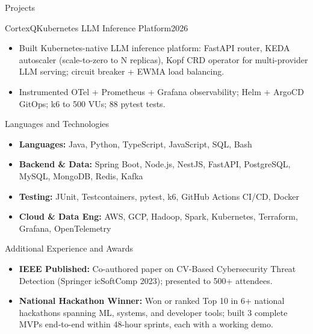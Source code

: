 \documentclass[]{mcdowellcv}
\begin{document}
\begin{cvsection}{Projects}
  \begin{cvsubsection}{CortexQ}{Kubernetes LLM Inference Platform}{2026}
    \begin{itemize}
      \item Built Kubernetes-native LLM inference platform: FastAPI router, KEDA autoscaler (scale-to-zero to N replicas), Kopf CRD operator for multi-provider LLM serving; circuit breaker + EWMA load balancing.
      \item Instrumented OTel + Prometheus + Grafana observability; Helm + ArgoCD GitOps; k6 to 500 VUs; 88 pytest tests.
    \end{itemize}
  \end{cvsubsection}
\end{cvsection}

\begin{cvsection}{Languages and Technologies}
  \begin{cvsubsection}{}{}{}
    \begin{itemize}
      \item \textbf{Languages:} Java, Python, TypeScript, JavaScript, SQL, Bash
      \item \textbf{Backend \& Data:} Spring Boot, Node.js, NestJS, FastAPI, PostgreSQL, MySQL, MongoDB, Redis, Kafka
      \item \textbf{Testing:} JUnit, Testcontainers, pytest, k6, GitHub Actions CI/CD, Docker
      \item \textbf{Cloud \& Data Eng:} AWS, GCP, Hadoop, Spark, Kubernetes, Terraform, Grafana, OpenTelemetry
    \end{itemize}
  \end{cvsubsection}
\end{cvsection}

\begin{cvsection}{Additional Experience and Awards}
  \begin{cvsubsection}{}{}{}
    \begin{itemize}
      \item \textbf{IEEE Published:} Co-authored paper on CV-Based Cybersecurity Threat Detection (Springer icSoftComp 2023); presented to 500+ attendees.
      \item \textbf{National Hackathon Winner:} Won or ranked Top 10 in 6+ national hackathons spanning ML, systems, and developer tools; built 3 complete MVPs end-to-end within 48-hour sprints, each with a working demo.
    \end{itemize}
  \end{cvsubsection}
\end{cvsection}
\end{document}
